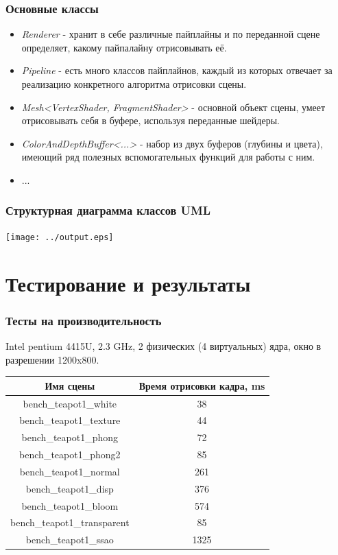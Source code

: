 \documentclass{beamer}
\begin{document}
\begin{frame}
	\frametitle{Основные классы}
	
	\begin{itemize}
		\item<1-> \textit{Renderer} - хранит в себе различные пайплайны и по переданной сцене определяет, какому пайпалайну отрисовывать её.
		\item<1-> \textit{Pipeline} - есть много классов пайплайнов, каждый из которых отвечает за реализацию конкретного алгоритма отрисовки сцены.
		\item<1-> \textit{Mesh<VertexShader, FragmentShader>} - основной объект сцены, умеет отрисовывать себя в буфере, используя переданные шейдеры.
		\item<1-> \textit{ColorAndDepthBuffer<...>} - набор из двух буферов (глубины и цвета), имеющий ряд полезных вспомогательных функций для работы с ним.
		\item<1-> ...
	\end{itemize}

\end{frame}

\begin{frame}
	\frametitle{Структурная диаграмма классов UML}
	
	\begin{center}\texttt{[image: ../output.eps]}\end{center}
\end{frame}

\section{Тестирование и результаты}
\begin{frame}
	\frametitle{Тесты на производительность}
	
	Intel pentium 4415U, 2.3 GHz, 2 физических (4 виртуальных) ядра, окно в разрешении 1200x800. \\
	\begin{center}\begin{tabular}{|c|c|}
		\hline
		Имя сцены & Время отрисовки кадра, ms \\
		\hline
		bench\_teapot1\_white & 38 \\
		bench\_teapot1\_texture & 44 \\
		bench\_teapot1\_phong & 72 \\
		bench\_teapot1\_phong2 & 85 \\
		bench\_teapot1\_normal & 261 \\
		bench\_teapot1\_disp & 376 \\
		bench\_teapot1\_bloom & 574 \\
		bench\_teapot1\_transparent & 85 \\
		bench\_teapot1\_ssao & 1325 \\
		\hline
	\end{tabular}\end{center}
	
\end{frame}
\end{document}
